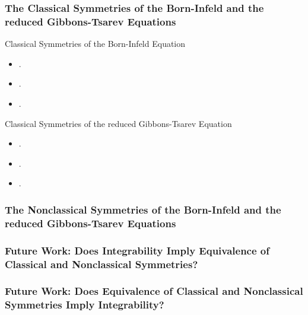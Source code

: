 \documentclass{beamer}
\begin{document}
\begin{frame}
    \frametitle{The Classical Symmetries of the Born-Infeld and the reduced Gibbons-Tsarev Equations}
        \begin{large}Classical Symmetries of the Born-Infeld Equation\end{large}
        \begin{itemize}
            \item .
            \item .
            \item .
        \end{itemize}
        \vspace*{0.25in}
        \begin{large}Classical Symmetries of the reduced Gibbons-Tsarev Equation\end{large}
        \begin{itemize}
            \item .
            \item .
            \item .
        \end{itemize}
\end{frame}


\begin{frame}
    \frametitle{The Nonclassical Symmetries of the Born-Infeld and the reduced Gibbons-Tsarev Equations}

\end{frame}



\begin{frame}
    \frametitle{Future Work: Does Integrability Imply Equivalence of Classical and Nonclassical Symmetries?}

\end{frame}



\begin{frame}
    \frametitle{Future Work: Does Equivalence of Classical and Nonclassical Symmetries Imply Integrability?}

\end{frame}
\end{document}
